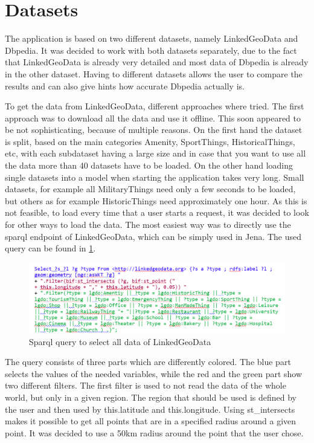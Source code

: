 \section{Datasets}
The application is based on two different datasets, namely LinkedGeoData and Dbpedia. It was decided to work with both datasets separately, due to the fact that LinkedGeoData is already very detailed and most data of Dbpedia is already in the other dataset. Having to different datasets allows the user to compare the results and can also give hints how accurate Dbpedia actually is. 

To get the data from LinkedGeoData, different approaches where tried. The first approach was to download all the data and use it offline. This soon appeared to be not sophisticating, because of multiple reasons. On the first hand the dataset is split, based on the main categories Amenity, SportThings, HistoricalThings, etc, with each subdataset having a large size and in case that you want to use all the data more than 40 datasets have to be loaded. On the other hand loading single datasets into a model when starting the application takes very long. Small datasets, for example all MilitaryThings need only a few seconds to be loaded, but others as for example HistoricThings need approximately one hour. As this is not feasible, to load every time that a user starts a request, it was decided to look for other ways to load the data. The most easiest way was to directly use the sparql endpoint of LinkedGeoData, which can be simply used in Jena. The used query can be found in \ref{fig:sparqlLGD}. 

\begin{figure}
	\centering
	\includegraphics[scale=0.7]{./content/sparqlLGD.png}
	\caption{Sparql query to select all data of LinkedGeoData}\label{fig:sparqlLGD}
\end{figure}

The query consists of three parts which are differently colored. The blue part selects the values of the needed variables, while the red and the green part show two different filters. The first filter is used to not read the data of the whole world, but only in a given region. The region that should be used is defined by the user and then used by this.latitude and this.longitude. Using st\_intersects makes it possible to get all points that are in a specified radius around a given point. It was decided to use a 50km radius around the point that the user chose. 

